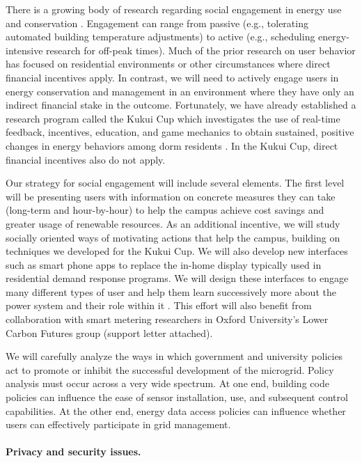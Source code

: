 There is a growing body of research regarding social engagement in energy
use and conservation
\cite{Hargreaves10,Stromback11,Darby06,Allcott11,Darby11,Hargreaves10,Faruqui10,
  Herter07}.  Engagement can range from passive (e.g., tolerating automated
building temperature adjustments) to active (e.g., scheduling
energy-intensive research for off-peak times).  Much of the prior research
on user behavior has focused on residential environments or other
circumstances where direct financial incentives apply.  In contrast, we
will need to actively engage users in energy conservation and management in
an environment where they have only an indirect financial stake in the
outcome.  Fortunately, we have already established a research program
called the Kukui Cup which investigates the use of real-time feedback,
incentives, education, and game mechanics to obtain sustained, positive
changes in energy behaviors among dorm residents
\cite{csdl2-11-03,csdl2-11-02}. In the Kukui Cup, direct financial
incentives also do not apply.

Our strategy for social engagement will include several elements. The first
level will be presenting users with information on concrete measures they
can take (long-term and hour-by-hour) to help the campus achieve cost
savings and greater usage of renewable resources. As an additional
incentive, we will study socially oriented ways of motivating actions that
help the campus, building on techniques we developed for the Kukui Cup. We
will also develop new interfaces such as smart phone apps to replace the
in-home display typically used in residential demand response programs. We
will design these interfaces to engage many different types of user and
help them learn successively more about the power system and their role
within it \cite{Stromback11}. This effort will also benefit from
collaboration with smart metering researchers in Oxford University's Lower
Carbon Futures group (support letter attached).

We will carefully analyze the ways in which government and university
policies act to promote or inhibit the successful development of the
microgrid.  Policy analysis must occur across a very wide spectrum. At one
end, building code policies can influence the ease of sensor installation,
use, and subsequent control capabilities.  At the other end, energy data access
policies can influence whether users can effectively participate in grid
management. 

\paragraph{Privacy and security issues.}


